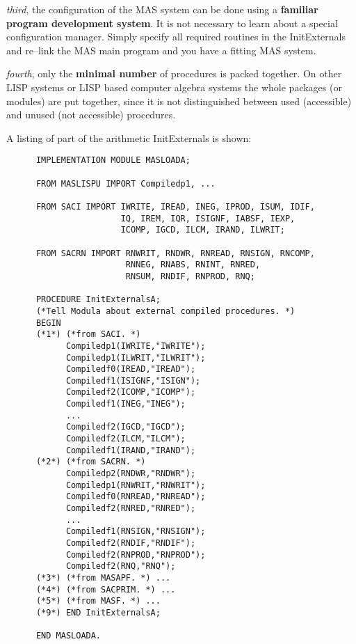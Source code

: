 {\em third}, the configuration of the MAS system can be done
using a {\bf familiar program development system}.
It is not necessary to learn about a special configuration
manager. Simply specify all required routines in 
the InitExternals and re--link the MAS main program and you have
a fitting MAS system.

{\em fourth}, only the 
{\bf minimal number} of procedures is packed together.
On other LISP systems or LISP based computer 
algebra systems the whole packages (or modules) 
are put together, since it is not distinguished between
used (accessible) and unused (not accessible) procedures.   

A listing of part of the arithmetic 
InitExternals is shown:

{\small
\begin{verbatim}
      IMPLEMENTATION MODULE MASLOADA;

      FROM MASLISPU IMPORT Compiledp1, ...

      FROM SACI IMPORT IWRITE, IREAD, INEG, IPROD, ISUM, IDIF,  
                       IQ, IREM, IQR, ISIGNF, IABSF, IEXP, 
                       ICOMP, IGCD, ILCM, IRAND, ILWRIT;
 
      FROM SACRN IMPORT RNWRIT, RNDWR, RNREAD, RNSIGN, RNCOMP, 
                        RNNEG, RNABS, RNINT, RNRED, 
                        RNSUM, RNDIF, RNPROD, RNQ;

      PROCEDURE InitExternalsA;
      (*Tell Modula about external compiled procedures. *)
      BEGIN 
      (*1*) (*from SACI. *)
            Compiledp1(IWRITE,"IWRITE");
            Compiledp1(ILWRIT,"ILWRIT");
            Compiledf0(IREAD,"IREAD");
            Compiledf1(ISIGNF,"ISIGN");
            Compiledf2(ICOMP,"ICOMP");
            Compiledf1(INEG,"INEG");
            ... 
            Compiledf2(IGCD,"IGCD");
            Compiledf2(ILCM,"ILCM");
            Compiledf1(IRAND,"IRAND");
      (*2*) (*from SACRN. *)
            Compiledp2(RNDWR,"RNDWR");
            Compiledp1(RNWRIT,"RNWRIT");
            Compiledf0(RNREAD,"RNREAD");
            Compiledf2(RNRED,"RNRED");
            ...
            Compiledf1(RNSIGN,"RNSIGN");
            Compiledf2(RNDIF,"RNDIF");
            Compiledf2(RNPROD,"RNPROD");
            Compiledf2(RNQ,"RNQ");
      (*3*) (*from MASAPF. *) ...
      (*4*) (*from SACPRIM. *) ...
      (*5*) (*from MASF. *) ...
      (*9*) END InitExternalsA;

      END MASLOADA.
\end{verbatim}
}


